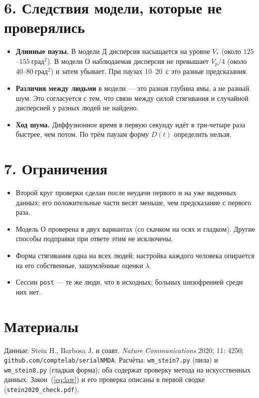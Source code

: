 \documentclass[10pt,a4paper]{article}
\newcommand{\dsq}{\text{град}^2}
\begin{document}
\section*{6. Следствия модели, которые не проверялись}

\begin{itemize}
\item \textbf{Длинные паузы.} В модели Д дисперсия насыщается на уровне $V_*$ (около $125$--$155~\dsq$). В модели О
наблюдаемая дисперсия не превышает $V_p/4$ (около $40$--$80~\dsq$) и затем убывает. При паузах 10--20~с это разные
предсказания.
\item \textbf{Различия между людьми} в модели --- это разная глубина ямы, а не разный шум. Это согласуется с тем, что
связи между силой стягивания и случайной дисперсией у разных людей не найдено.
\item \textbf{Ход шума.} Диффузионное время в первую секунду идёт в три-четыре раза быстрее, чем потом. По трём
паузам форму $D(t)$ определить нельзя.
\end{itemize}

\section*{7. Ограничения}

\begin{itemize}
\item Второй круг проверки сделан после неудачи первого и на уже виденных данных; его положительные части весят
меньше, чем предсказание с первого раза.
\item Модель О проверена в двух вариантах (со скачком на осях и гладком). Другие способы подправки при ответе этим не
исключены.
\item Форма стягивания одна на всех людей; настройка каждого человека опирается на его собственные, зашумлённые
оценки $\lambda$.
\item Сессии \texttt{post} --- те же люди, что в исходных; больных шизофренией среди них нет.
\end{itemize}

\section*{Материалы}

{\small Данные: Stein H., Barbosa J. и соавт. \emph{Nature Communications} 2020; 11: 4250;
\texttt{github.com/comptelab/serialNMDA}. Расчёты: \texttt{wm\_stein7.py} (пила) и \texttt{wm\_stein8.py} (гладкая
форма); оба содержат проверку метода на искусственных данных. Закон~(\ref{eq:law}) и его проверка описаны в первой
сводке (\texttt{stein2020\_check.pdf}).}
\end{document}
